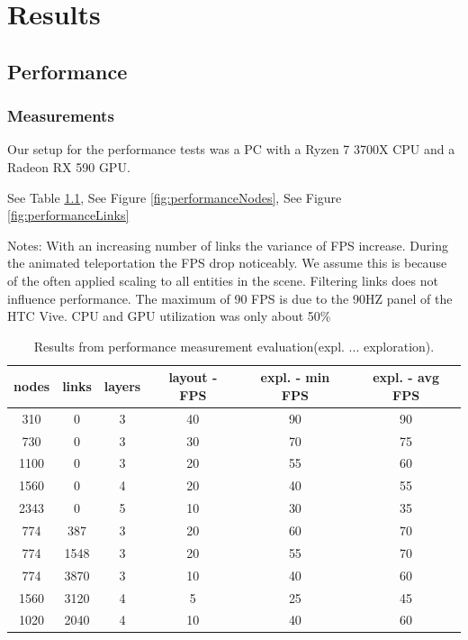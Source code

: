 \chapter{Results}

\section{Performance}

\subsection{Measurements}

Our setup for the performance tests was a PC with a Ryzen 7 3700X CPU and a Radeon RX 590 GPU.

See Table \ref{table:resultFPS}, See Figure \ref{fig:performanceNodes}, See Figure \ref{fig:performanceLinks}

Notes:
With an increasing number of links the variance of FPS increase. During the animated teleportation the FPS drop noticeably. We assume this is because of the often applied scaling to all entities in the scene. Filtering links does not influence performance. The maximum of 90 FPS is due to the 90HZ panel of the HTC Vive.
CPU and GPU utilization was only about 50\%

\begin{table}
    \centering
    \begin{tabular}{ | c | c | c | c | c | c | }
        \hline
        \textbf{nodes} & \textbf{links} &\textbf{layers} &\textbf{layout - FPS} &\textbf{expl. - min FPS} &\textbf{expl. - avg FPS}\\
        \hline
        310  & 0    & 3 & 40 & 90 & 90\\ \hline
        730  & 0    & 3 & 30 & 70 & 75\\ \hline
        1100 & 0    & 3 & 20 & 55 & 60\\ \hline
        1560 & 0    & 4 & 20 & 40 & 55\\ \hline
        2343 & 0    & 5 & 10 & 30 & 35\\ \hline
        774  & 387  & 3 & 20 & 60 & 70\\ \hline
        774  & 1548 & 3 & 20 & 55 & 70\\ \hline
        774  & 3870 & 3 & 10 & 40 & 60\\ \hline
        1560 & 3120 & 4 & 5  & 25 & 45\\ \hline
        1020 & 2040 & 4 & 10 & 40 & 60\\ \hline
     \end{tabular}
     \caption{Results from performance measurement evaluation(expl. ... exploration).}
     \label{table:resultFPS}
\end{table}


